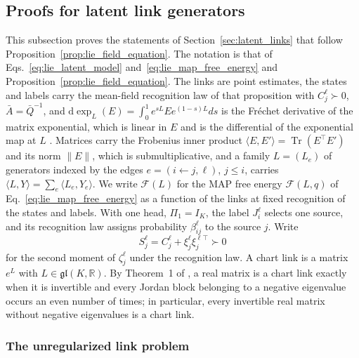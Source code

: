 \documentclass[twoside,11pt]{article}
\begin{document}
\subsection{Proofs for latent link generators}
\label{app:latent_link_proofs}

This subsection proves the statements of Section~\ref{sec:latent_links} that follow Proposition~\ref{prop:lie_field_equation}. The notation is that of Eqs.~\eqref{eq:lie_latent_model} and~\eqref{eq:lie_map_free_energy} and Proposition~\ref{prop:lie_field_equation}. The links are point estimates, the states and labels carry the mean-field recognition law of that proposition with $C_j^\ell\succ0$, $\bar A=\bar Q^{-1}$, and $\mathrm d\exp_{L}(E)=\int_0^1e^{sL}Ee^{(1-s)L}ds$ is the Fr\'echet derivative of the matrix exponential, which is linear in $E$ and is the differential of the exponential map at $L$ \citep[Ch.~10]{Higham2008}. Matrices carry the Frobenius inner product $\langle E,E'\rangle=\operatorname{Tr}(E^\top E')$ and its norm $\|E\|$, which is submultiplicative, and a family $L=(L_e)$ of generators indexed by the edges $e=(i\leftarrow j,\ell)$, $j\le i$, carries $\langle L,Y\rangle=\sum_e\langle L_e,Y_e\rangle$. We write $\mathcal F(L)$ for the MAP free energy $\mathcal F(L,q)$ of Eq.~\eqref{eq:lie_map_free_energy} as a function of the links at fixed recognition of the states and labels. With one head, $\Pi_1=I_K$, the label $J_i^\ell$ selects one source, and its recognition law assigns probability $\beta_{ij}^\ell$ to the source $j$. Write
\begin{equation}
S_j^\ell=C_j^\ell+\xi_j^\ell\xi_j^{\ell\top}\succ0
\label{eq:app_second_moment}
\end{equation}
for the second moment of $\zeta_j^\ell$ under the recognition law. A chart link is a matrix $e^L$ with $L\in\mathfrak{gl}(K,\mathbb R)$. By Theorem~1 of \citet{culver1966existence}, a real matrix is a chart link exactly when it is invertible and every Jordan block belonging to a negative eigenvalue occurs an even number of times; in particular, every invertible real matrix without negative eigenvalues is a chart link.

\subsubsection{The unregularized link problem}
\end{document}
